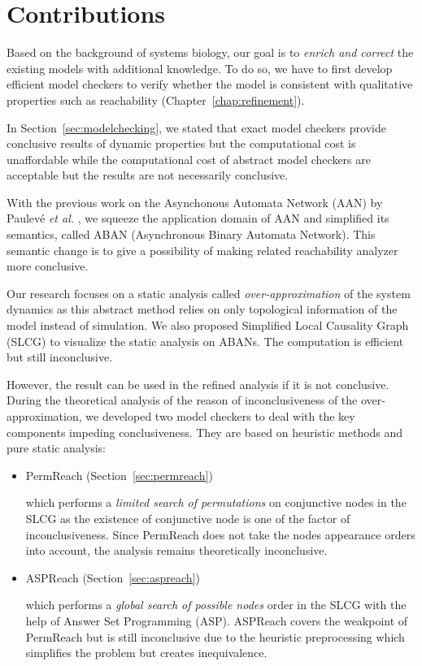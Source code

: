 \section{Contributions}

Based on the background of systems biology, our goal is to \textit{enrich and correct} the existing models with additional knowledge.
To do so, we have to first develop efficient model checkers to verify whether the model is consistent with qualitative properties such as reachability (Chapter~\ref{chap:refinement}).

In Section~\ref{sec:modelchecking}, we stated that exact model checkers provide conclusive results of dynamic properties but the computational cost is unaffordable while the computational cost of abstract model checkers are acceptable but the results are not necessarily conclusive.

With the previous work on the Asynchonous Automata Network (AAN) by Paulev\'e \textit{et al.} \cite{folschette2015},
we squeeze the application domain of AAN and simplified its semantics, called ABAN (Asynchronous Binary Automata Network).
This semantic change is to give a possibility of making related reachability analyzer more conclusive.

Our research focuses on a static analysis called \textit{over-approximation} of the system dynamics as this abstract method relies on only topological information of the model instead of simulation.
We also proposed Simplified Local Causality Graph (SLCG) to visualize the static analysis on ABANs.
The computation is efficient but still inconclusive.

However, the result can be used in the refined analysis if it is not conclusive.
During the theoretical analysis of the reason of inconclusiveness of the over-approximation, we developed two model checkers to deal with the key components impeding conclusiveness.
They are based on heuristic methods and pure static analysis:
\begin{itemize}
    \item PermReach (Section~\ref{sec:permreach})
    
        which performs a \textit{limited search of permutations} on conjunctive nodes in the SLCG as the existence of conjunctive node is one of the factor of inconclusiveness.
        Since PermReach does not take the nodes appearance orders into account, the analysis remains theoretically inconclusive.
    \item ASPReach (Section~\ref{sec:aspreach})
        
        which performs a \textit{global search of possible nodes} order in the SLCG with the help of Answer Set Programming (ASP).
        ASPReach covers the weakpoint of PermReach but is still inconclusive due to the heuristic preprocessing which simplifies the problem but creates inequivalence.
\end{itemize}

